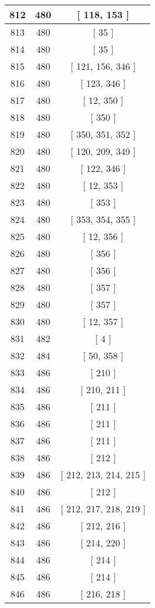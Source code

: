 \begin{center}
\begin{longtable}[H]{|| c c c ||}
812 & 480 & [ 118, 153 ] \\ 
\hline
813 & 480 & [ 35 ] \\ 
\hline
814 & 480 & [ 35 ] \\ 
\hline
815 & 480 & [ 121, 156, 346 ] \\ 
\hline
816 & 480 & [ 123, 346 ] \\ 
\hline
817 & 480 & [ 12, 350 ] \\ 
\hline
818 & 480 & [ 350 ] \\ 
\hline
819 & 480 & [ 350, 351, 352 ] \\ 
\hline
820 & 480 & [ 120, 209, 349 ] \\ 
\hline
821 & 480 & [ 122, 346 ] \\ 
\hline
822 & 480 & [ 12, 353 ] \\ 
\hline
823 & 480 & [ 353 ] \\ 
\hline
824 & 480 & [ 353, 354, 355 ] \\ 
\hline
825 & 480 & [ 12, 356 ] \\ 
\hline
826 & 480 & [ 356 ] \\ 
\hline
827 & 480 & [ 356 ] \\ 
\hline
828 & 480 & [ 357 ] \\ 
\hline
829 & 480 & [ 357 ] \\ 
\hline
830 & 480 & [ 12, 357 ] \\ 
\hline
831 & 482 & [ 4 ] \\ 
\hline
832 & 484 & [ 50, 358 ] \\ 
\hline
833 & 486 & [ 210 ] \\ 
\hline
834 & 486 & [ 210, 211 ] \\ 
\hline
835 & 486 & [ 211 ] \\ 
\hline
836 & 486 & [ 211 ] \\ 
\hline
837 & 486 & [ 211 ] \\ 
\hline
838 & 486 & [ 212 ] \\ 
\hline
839 & 486 & [ 212, 213, 214, 215 ] \\ 
\hline
840 & 486 & [ 212 ] \\ 
\hline
841 & 486 & [ 212, 217, 218, 219 ] \\ 
\hline
842 & 486 & [ 212, 216 ] \\ 
\hline
843 & 486 & [ 214, 220 ] \\ 
\hline
844 & 486 & [ 214 ] \\ 
\hline
845 & 486 & [ 214 ] \\ 
\hline
846 & 486 & [ 216, 218 ] \\ 
\hline

\end{longtable}
\end{center}
